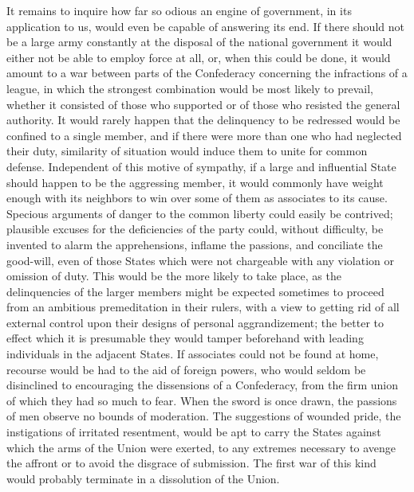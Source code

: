 It remains to inquire how far so odious an engine of government, in its application to us, would even be capable of answering its end. If there should not be a large army constantly at the disposal of the national government it would either not be able to employ force at all, or, when this could be done, it would amount to a war between parts of the Confederacy concerning the infractions of a league, in which the strongest combination would be most likely to prevail, whether it consisted of those who supported or of those who resisted the general authority. It would rarely happen that the delinquency to be redressed would be confined to a single member, and if there were more than one who had neglected their duty, similarity of situation would induce them to unite for common defense. Independent of this motive of sympathy, if a large and influential State should happen to be the aggressing member, it would commonly have weight enough with its neighbors to win over some of them as associates to its cause. Specious arguments of danger to the common liberty could easily be contrived; plausible excuses for the deficiencies of the party could, without difficulty, be invented to alarm the apprehensions, inflame the passions, and conciliate the good-will, even of those States which were not chargeable with any violation or omission of duty. This would be the more likely to take place, as the delinquencies of the larger members might be expected sometimes to proceed from an ambitious premeditation in their rulers, with a view to getting rid of all external control upon their designs of personal aggrandizement; the better to effect which it is presumable they would tamper beforehand with leading individuals in the adjacent States. If associates could not be found at home, recourse would be had to the aid of foreign powers, who would seldom be disinclined to encouraging the dissensions of a Confederacy, from the firm union of which they had so much to fear. When the sword is once drawn, the passions of men observe no bounds of moderation. The suggestions of wounded pride, the instigations of irritated resentment, would be apt to carry the States against which the arms of the Union were exerted, to any extremes necessary to avenge the affront or to avoid the disgrace of submission. The first war of this kind would probably terminate in a dissolution of the Union.

